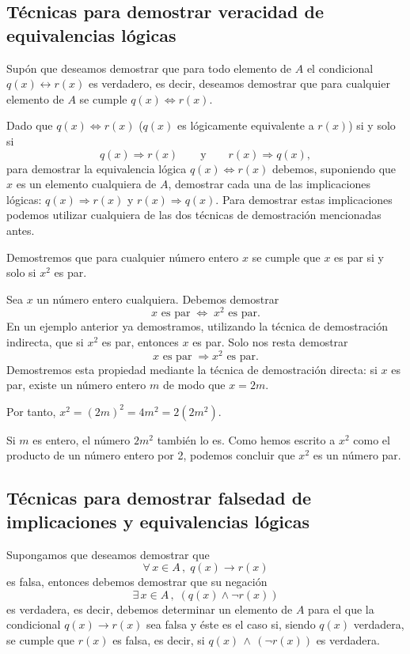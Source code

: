 \subsection{T\'ecnicas para demostrar veracidad de equivalencias l\'ogicas}

Sup\'on que deseamos demostrar que 
para todo elemento de 
$A$ el condicional $q(x) \leftrightarrow r(x)$
es verdadero,
es decir, deseamos demostrar que
para cualquier elemento de $A$ se cumple 
$q(x) \Leftrightarrow r(x)$.

Dado que $q(x) \Leftrightarrow r(x)$ ($q(x)$ es l\'ogicamente
equivalente a $r(x)$) si y solo si $$q(x) \Rightarrow r(x)\qquad
\mbox{y} \qquad r(x) \Rightarrow q(x),$$
para demostrar la equivalencia l\'ogica
$q(x) \Leftrightarrow r(x)$ debemos, suponiendo
que $x$ es un elemento cualquiera de $A$, demostrar 
cada una de las implicaciones l\'ogicas: $q(x) \Rightarrow r(x)$
y $r(x) \Rightarrow q(x)$. 
Para demostrar estas implicaciones podemos utilizar
cualquiera de las dos t\'ecnicas de demostraci\'on mencionadas antes.

\begin{ejemplo}
	Demostremos que para cualquier n\'umero entero $x$ se cumple que 
	$x$ es par si y solo si $x^2$ es par.
	
	Sea $x$ un n\'umero entero cualquiera.
	Debemos demostrar 
	\[
		x \mbox{ es par}\;\Leftrightarrow\; x^2 \mbox{ es par}.
	\]
	En un ejemplo anterior ya demostramos, utilizando la
	t\'ecnica de demostraci\'on indirecta, que 
	si $x^2$ es par, entonces $x$ es par.
	Solo nos resta demostrar 
	\[
		x\mbox{ es par}\;\Rightarrow x^2\mbox{ es par}.
	\]
	Demostremos esta propiedad mediante la t\'ecnica
	de demostraci\'on directa: si $x$ es par, existe
	un n\'umero entero $m$ de modo que $x=2m$.
	
	Por tanto, $x^2 = (2m)^2 = 4m^2 = 2(2m^2)$.
	
	Si $m$ es entero, el n\'umero $2m^2$ tambi\'en lo es.
	Como hemos escrito a $x^2$ como el producto
	de un n\'umero entero por 2, podemos concluir
	que $x^2$ es un n\'umero par.
\end{ejemplo}

\subsection{T\'ecnicas para demostrar falsedad de implicaciones y 
	equivalencias l\'ogicas}

Supongamos que deseamos demostrar que 
\[
	\forall\, x\in A\, ,\; q(x) \rightarrow r(x)
\]
es falsa, entonces debemos demostrar que su negaci\'on
\[
	\exists\,x\in A\, ,\; (q(x) \wedge 
\neg r(x))
\]
es verdadera, es decir, debemos determinar un elemento
de $A$ para el que la condicional $q(x) \rightarrow r(x)$ sea
falsa y \'este es el caso si, siendo $q(x)$ verdadera, se cumple
que $r(x)$ es falsa, es decir, si
$q(x)\,\wedge\,(
\neg r(x))$ es verdadera.

